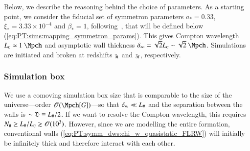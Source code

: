 




Below, we describe the reasoning behind the choice of parameters. As a starting point, we consider the fiducial set of symmetron parameters $a_\ast =0.33$, $\xi_\ast = 3.33\times 10^{-4}$ and $\beta_\ast = 1$, following~\citet{christiansenCosmologicalSimulationsPhase2024}, that will be defined below (\cref{eq:PT:sims:mapping_symmetron_params}). This gives Compton wavelength $L\nped{C}\approx 1~\Mpch$ and asymptotic wall thickness $\delta_\infty = \sqrt{2} L\nped{C}\sim \sqrt{2} ~\Mpch$. %
Simulations are initiated and broken at redshifts $\mathfrak{z}_\mathrm{i}$ and $\mathfrak{z}_\mathrm{f}$, respectively.

\subsubsection{Simulation box}

    We use a comoving simulation box size that is comparable to the size of the universe---order $\mathscr{O}(\Mpch[G])$---so that $\delta_\mathrm{w}\ll L_\#$ and the separation between the walls is $\sim \mathfrak{D} \equiv  L_{\#}/2$. If we want to resolve the Compton wavelength, this requires $N_\# \geq L_\#/L_{\text{\tiny{C}}} \gtrsim \mathscr{O}(10^3)$. However, since we are modelling the entire formation, conventional walls (\cref{eq:PT:symm_dws:chi_w_quasistatic_FLRW}) will initially be infinitely thick and therefore interact with each other. 


